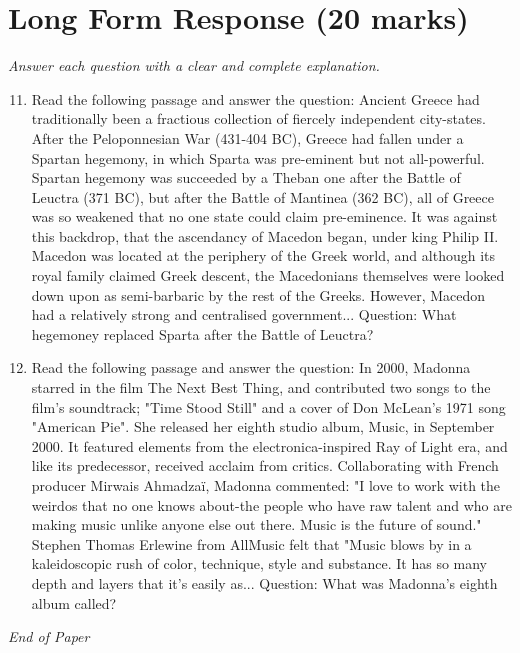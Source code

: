 \documentclass[12pt]{article}
\begin{document}
\section*{Long Form Response (20 marks)}
\textit{Answer each question with a clear and complete explanation.}
\begin{enumerate}[label=\arabic*.]
\setcounter{enumi}{10}
\item Read the following passage and answer the question: Ancient Greece had traditionally been a fractious collection of fiercely independent city-states. After the Peloponnesian War (431-404 BC), Greece had fallen under a Spartan hegemony, in which Sparta was pre-eminent but not all-powerful. Spartan hegemony was succeeded by a Theban one after the Battle of Leuctra (371 BC), but after the Battle of Mantinea (362 BC), all of Greece was so weakened that no one state could claim pre-eminence. It was against this backdrop, that the ascendancy of Macedon began, under king Philip II. Macedon was located at the periphery of the Greek world, and although its royal family claimed Greek descent, the Macedonians themselves were looked down upon as semi-barbaric by the rest of the Greeks. However, Macedon had a relatively strong and centralised government... Question: What hegemoney replaced Sparta after the Battle of Leuctra?
\item Read the following passage and answer the question: In 2000, Madonna starred in the film The Next Best Thing, and contributed two songs to the film's soundtrack; "Time Stood Still" and a cover of Don McLean's 1971 song "American Pie". She released her eighth studio album, Music, in September 2000. It featured elements from the electronica-inspired Ray of Light era, and like its predecessor, received acclaim from critics. Collaborating with French producer Mirwais Ahmadzaï, Madonna commented: "I love to work with the weirdos that no one knows about-the people who have raw talent and who are making music unlike anyone else out there. Music is the future of sound." Stephen Thomas Erlewine from AllMusic felt that "Music blows by in a kaleidoscopic rush of color, technique, style and substance. It has so many depth and layers that it's easily as... Question: What was Madonna's eighth album called?
\end{enumerate}

\vfill
\noindent\textit{End of Paper}
\end{document}
